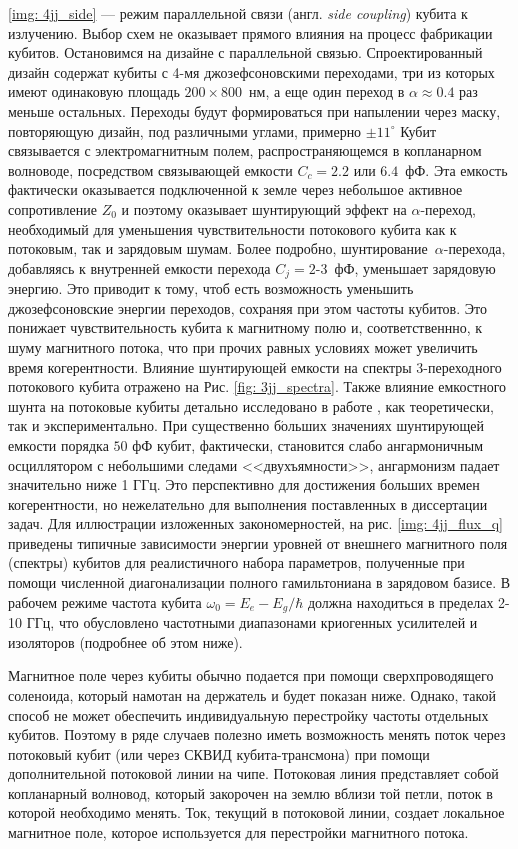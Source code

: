 \ref{img: 4jj_side} --- режим параллельной связи (англ. \textit{side coupling}) кубита к излучению. Выбор схем не оказывает прямого влияния на процесс фабрикации кубитов. Остановимся на дизайне с параллельной связью. Спроектированный дизайн содержат кубиты с 4-мя джозефсоновскими переходами, три из которых имеют одинаковую площадь $200\times800$~нм, а еще один переход в $\alpha\approx0.4$ раз меньше остальных. Переходы будут формироваться при напылении через маску, повторяющую дизайн, под различными углами, примерно $\pm11^\circ$ Кубит связывается с электромагнитным полем, распространяющемся в копланарном волноводе, посредством связывающей емкости $C_c=2.2$ или $6.4$~фФ. Эта емкость фактически оказывается подключенной к земле через небольшое активное сопротивление $Z_0$ и поэтому оказывает шунтирующий эффект на $\alpha$-переход, необходимый для уменьшения чувствительности потокового кубита как к потоковым, так и зарядовым шумам. Более подробно, шунтирование~$\alpha$-перехода, добавляясь к внутренней емкости перехода $C_j=2$-$3$~фФ, уменьшает зарядовую энергию. Это приводит к тому, чтоб есть возможность уменьшить джозефсоновские энергии переходов, сохраняя при этом частоты кубитов. Это понижает чувствительность кубита к магнитному полю и, соответственнно, к шуму магнитного потока, что при прочих равных условиях может увеличить время когерентности. Влияние шунтирующей емкости на спектры 3-переходного потокового кубита отражено на Рис. \ref{fig: 3jj_spectra}. Также влияние емкостного шунта на потоковые кубиты детально исследовано в работе \cite{yan2016flux}, как теоретически, так и экспериментально. При существенно б$\acute{\text{о}}$льших значениях шунтирующей емкости порядка $50$ фФ кубит, фактически, становится слабо ангармоничным осциллятором с небольшими следами <<двухъямности>>, ангармонизм падает значительно ниже 1 ГГц. Это перспективно для достижения больших времен когерентности, но нежелательно для выполнения поставленных в диссертации задач. Для иллюстрации изложенных закономерностей, на рис. \ref{img: 4jj_flux_q} приведены типичные зависимости энергии уровней от внешнего магнитного поля (спектры) кубитов для реалистичного набора параметров, полученные при помощи численной диагонализации полного гамильтониана в зарядовом базисе. В рабочем режиме частота кубита $\omega_0=E_e-E_g/\hbar$ должна находиться в пределах 2-10 ГГц, что обусловлено частотными диапазонами криогенных усилителей и изоляторов (подробнее об этом ниже).

Магнитное поле через кубиты обычно подается при помощи сверхпроводящего соленоида, который намотан на держатель и будет показан ниже. Однако, такой способ не может обеспечить индивидуальную перестройку частоты отдельных кубитов. Поэтому в ряде случаев полезно иметь возможность менять поток через потоковый кубит (или через СКВИД кубита-трансмона) при помощи дополнительной потоковой линии на чипе. Потоковая линия представляет собой копланарный волновод, который закорочен на землю вблизи той петли, поток в которой необходимо менять. Ток, текущий в потоковой линии, создает локальное магнитное поле, которое используется для перестройки магнитного потока. 

